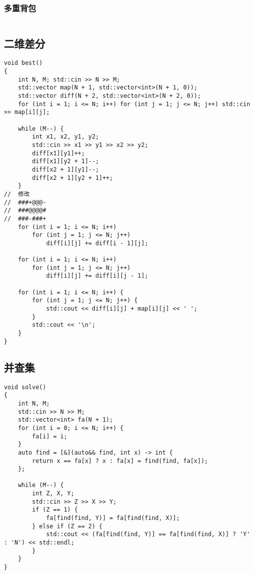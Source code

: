 \documentclass[a4paper, 10pt]{paper}
\newcommand{\cpp}[1]{\inputminted[frame=single, linenos=true]{cpp}{#1}}
\begin{document}
        \subsubsection{多重背包}
        \cpp{../多重背包.cpp}

        \subsection{二维差分}
        \begin{verbatim}
void best()
{
    int N, M; std::cin >> N >> M;
    std::vector map(N + 1, std::vector<int>(N + 1, 0));
    std::vector diff(N + 2, std::vector<int>(N + 2, 0));
    for (int i = 1; i <= N; i++) for (int j = 1; j <= N; j++) std::cin >> map[i][j];

    while (M--) {
        int x1, x2, y1, y2;
        std::cin >> x1 >> y1 >> x2 >> y2;
        diff[x1][y1]++;
        diff[x1][y2 + 1]--;
        diff[x2 + 1][y1]--;
        diff[x2 + 1][y2 + 1]++;
    }
//  修改
//  ###+@@@-
//  ###@@@@#
//  ###-###+
    for (int i = 1; i <= N; i++)
        for (int j = 1; j <= N; j++)
            diff[i][j] += diff[i - 1][j];

    for (int i = 1; i <= N; i++)
        for (int j = 1; j <= N; j++)
            diff[i][j] += diff[i][j - 1];

    for (int i = 1; i <= N; i++) {
        for (int j = 1; j <= N; j++) {
            std::cout << diff[i][j] + map[i][j] << ' ';
        }
        std::cout << '\n';
    }
}
        \end{verbatim}

        \subsection{并查集}
        \begin{verbatim}
void solve()
{
    int N, M;
    std::cin >> N >> M;
    std::vector<int> fa(N + 1);
    for (int i = 0; i <= N; i++) {
        fa[i] = i;
    }
    auto find = [&](auto&& find, int x) -> int {
        return x == fa[x] ? x : fa[x] = find(find, fa[x]);
    };

    while (M--) {
        int Z, X, Y;
        std::cin >> Z >> X >> Y;
        if (Z == 1) {
            fa[find(find, Y)] = fa[find(find, X)];
        } else if (Z == 2) {
            std::cout << (fa[find(find, Y)] == fa[find(find, X)] ? 'Y' : 'N') << std::endl;
        }
    }
}
        \end{verbatim}
\end{document}
